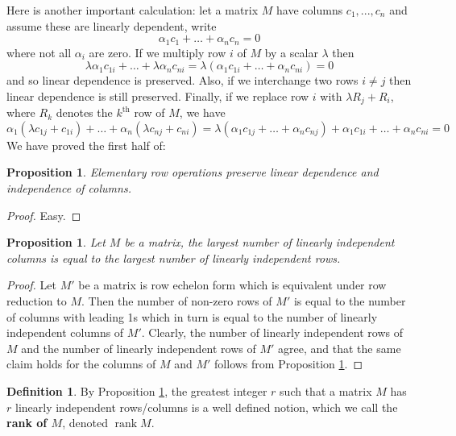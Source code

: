 \documentclass[12pt]{article}
\theoremstyle{plain}
\newtheorem{proposition}[thm]{Proposition}
\theoremstyle{definition}
\newtheorem{defn}[thm]{Definition} %
\begin{document}
Here is another important calculation: let a matrix $M$ have columns $c_1,...,c_n$ and assume these are linearly dependent, write
\begin{equation}\label{eq:linearly_dependent}
    \alpha_1c_1 + \hdots + \alpha_nc_n = 0
\end{equation}
where not all $\alpha_i$ are zero. If we multiply row $i$ of $M$ by a scalar $\lambda$ then
\begin{equation}
    \lambda \alpha_1 c_{1i} + \hdots + \lambda \alpha_n c_{ni} = \lambda (\alpha_1c_{1i} + \hdots + \alpha_nc_{ni}) = 0
\end{equation}
and so linear dependence is preserved. Also, if we interchange two rows $i \neq j$ then linear dependence is still preserved. Finally, if we replace row $i$ with $\lambda R_j + R_i$, where $R_k$ denotes the $k^{\text{th}}$ row of $M$, we have
\begin{equation}
    \alpha_1 (\lambda c_{1j} + c_{1i}) + \hdots + \alpha_n(\lambda c_{nj} + c_{ni}) = \lambda (\alpha_1c_{1j} + \hdots + \alpha_nc_{nj}) + \alpha_1c_{1i} + \hdots + \alpha_nc_{ni} = 0
\end{equation}
We have proved the first half of:
\begin{proposition}\label{prop:row_ops_lin_dep}
Elementary row operations preserve linear dependence and independence of columns.
\end{proposition}
\begin{proof}
Easy.
\end{proof}
\begin{proposition}\label{prop:number_independence}
Let $M$ be a matrix, the largest number of linearly independent columns is equal to the largest number of linearly independent rows.
\end{proposition}
\begin{proof}
Let $M'$ be a matrix is row echelon form which is equivalent under row reduction to $M$. Then the number of non-zero rows of $M'$ is equal to the number of columns with leading 1s which in turn is equal to the number of linearly independent columns of $M'$. Clearly, the number of linearly independent rows of $M$ and the number of linearly independent rows of $M'$ agree, and that the same claim holds for the columns of $M$ and $M'$ follows from Proposition \ref{prop:row_ops_lin_dep}.
\end{proof}
\begin{defn}
By Proposition \ref{prop:number_independence}, the greatest integer $r$ such that a matrix $M$ has $r$ linearly independent rows/columns is a well defined notion, which we call the \textbf{rank of $M$}, denoted $\operatorname{rank}M$.
\end{defn}
\end{document}
